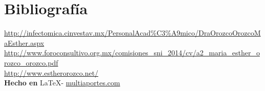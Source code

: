 \documentclass{article}
\begin{document}
\vspace{1cm}

\section*{Bibliograf\'ia}

\noindent \url{http://infectomica.cinvestav.mx/PersonalAcad%C3%A9mico/DraOrozcoOrozcoMaEsther.aspx}
\\
\noindent \url{http://www.foroconsultivo.org.mx/comisiones_sni_2014/cv/a2_maria_esther_orozco_orozco.pdf}
\\
\noindent \url{http://www.estherorozco.net/}
\\

\large{\hfill \textbf{Hecho en } \LaTeX - \url{multiaportes.com}}
\end{document}
